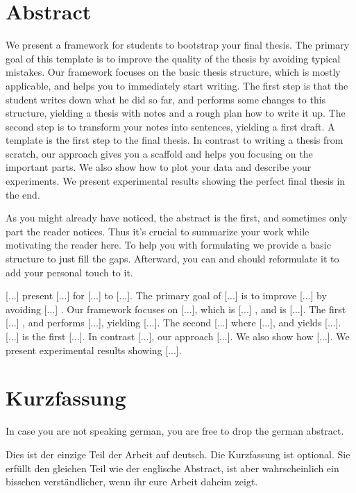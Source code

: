 \chapter{Abstract}

We present a framework for students to bootstrap your final thesis. The primary goal of this template is to improve the quality of the thesis by avoiding typical mistakes. Our framework focuses on the basic thesis structure, which is mostly applicable, and helps you to immediately start writing. The first step is that the student writes down what he did so far, and performs some changes to this structure, yielding a thesis with notes and a rough plan how to write it up. The second step is to transform your notes into sentences, yielding a first draft. A template is the first step to the final thesis. In contrast to writing a thesis from scratch, our approach gives you a scaffold and helps you focusing on the important parts. We also show how to plot your data and describe your experiments. We present experimental results showing the perfect final thesis in the end.

As you might already have noticed, the abstract is the first, and sometimes only part the reader notices.
Thus it's crucial to summarize your work while motivating the reader here.
To help you with formulating we provide a basic structure to just fill the gaps.
Afterward, you can and should reformulate it to add your personal touch to it.

[...] present [...] for [...] to [...]. The primary goal of [...] is to improve [...] by avoiding [...] . Our framework focuses on [...], which is [...] , and is [...]. The first [...] , and performs [...], yielding [...]. The second [...] where [...], and yields [...]. [...] is the first [...]. In contrast [...], our approach [...]. We also show how [...]. We present experimental results showing [...].
 

\chapter{Kurzfassung}

In case you are not speaking german, you are free to drop the german abstract.

Dies ist der einzige Teil der Arbeit auf deutsch. 
Die Kurzfassung ist optional.
Sie erfüllt den gleichen Teil wie der englische Abstract, ist aber wahrscheinlich ein bisschen verständlicher, wenn ihr eure Arbeit daheim zeigt.
